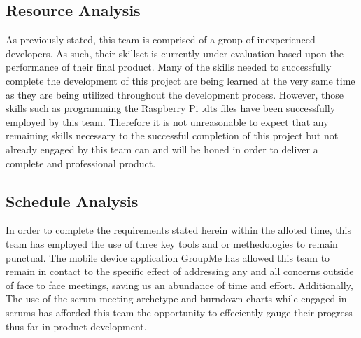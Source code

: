 \subsection{Resource Analysis}
As previously stated, this team is comprised of a group of inexperienced developers. As such, their skillset is currently under evaluation based upon the performance of their final product. Many of the skills needed to successfully complete the development of this project are being learned at the very same time as they are being utilized throughout the development process. However, those skills such as programming the Raspberry Pi .dts files have been successfully employed by this team. Therefore it is not unreasonable to expect that any remaining skills necessary to the successful completion of this project but not already engaged by this team can and will be honed in order to deliver a complete and professional product.

\subsection{Schedule Analysis}
In order to complete the requirements stated herein within the alloted time, this team has employed the use of three key tools and or methedologies to remain punctual. The mobile device application GroupMe has allowed this team to remain in contact to the specific effect of addressing any and all concerns outside of face to face meetings, saving us an abundance of time and effort. Additionally, The use of the scrum meeting archetype and burndown charts while engaged in scrums has afforded this team the opportunity to effeciently gauge their progress thus far in product development.
